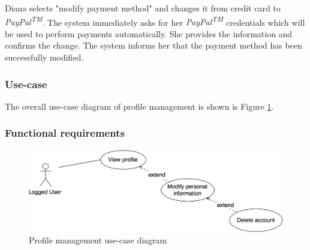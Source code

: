 Diana selects "modify payment method" and changes it from credit card to \emph{PayPal\textsuperscript{TM}}. The system immediately asks for her \emph{PayPal\textsuperscript{TM}} credentials which will be used to perform payments automatically. She provides the information and confirms the change. The system informs her that the payment method has been successfully modified.

\subsubsection{Use-case}

The overall use-case diagram of profile management is shown is Figure \ref{man_profile_uc}.

\subsubsection{Functional requirements}

\begin{figure}[H]
\begin{center}
		\includegraphics[width=\textwidth]{./specific_requirements/features/diagrams/man_profile_uc.png}
		\caption{Profile management use-case diagram}
		\label{man_profile_uc}
\end{center}
\end{figure}